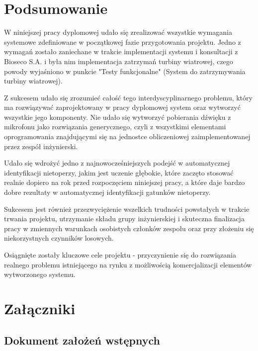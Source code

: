 \documentclass{sprz}
\begin{document}
\chapter{Podsumowanie}
W niniejszej pracy dyplomowej udało się zrealizować wszystkie wymagania systemowe zdefiniowane w początkowej fazie przygotowania projektu. Jedno z wymagań zostało zaniechane w trakcie implementacji systemu i konsultacji z Bioseco S.A. i była nim implementacja zatrzymań turbiny wiatrowej, czego powody wyjaśniono w punkcie "Testy funkcjonalne" (System do zatrzymywania turbiny wiatrowej). 


Z sukcesem udało się zrozumieć całość tego interdyscyplinarnego problemu, który ma rozwiązywać zaprojektowany w pracy dyplomowej system oraz wytworzyć wszystkie jego komponenty. Nie udało się wytworzyć pobierania dźwięku z mikrofonu jako rozwiązania generycznego, czyli z wszystkimi elementami oprogramowania znajdującymi się na jednostce obliczeniowej zaimplementowanej przez zespół inżynierski. 


Udało się wdrożyć jedno z najnowocześniejszych podejść w automatycznej identyfikacji nietoperzy, jakim jest uczenie głębokie, które zaczęto stosować realnie dopiero na rok przed rozpoczęciem niniejszej pracy, a które daje bardzo dobre rezultaty w automatycznej identyfikacji gatunków nietoperzy.

Sukcesem jest również przezwyciężenie wszelkich trudności powstałych w trakcie trwania projektu, utrzymanie składu grupy inżynierskiej i skuteczna finalizacja pracy w zmiennych warunkach osobistych członków zespołu oraz przy złożeniu się niekorzystnych czynników losowych.

Osiągnięte zostały kluczowe cele projektu - przyczynienie się do rozwiązania realnego problemu istniejącego na rynku z możliwością komercjalizacji elementów wytworzonego systemu. 


\chapter{Załączniki}

\section{Dokument założeń wstępnych}
\end{document}
